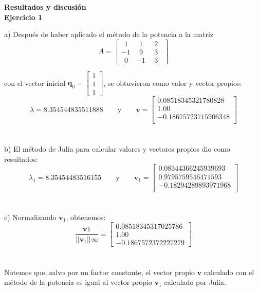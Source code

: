 \documentclass[11pt]{article}
\begin{document}
\newpage
\noindent
\textbf{\LARGE{Resultados y discusión}}
\\
\noindent
\textbf{Ejercicio 1}

a) Después de haber aplicado el método de la potencia a la matriz
$$
A =
\begin{bmatrix}
\ \ 1 & \ \ 1 & \ \ 2 \ \ \\
-1 & \ \ 9 & \ \ 3 \ \ \\
\ \ 0 & -1 & \ \ 3 \ \
\end{bmatrix}
$$

con el vector inicial $\textbf{q}_0 =
\begin{bmatrix}
1 \\
1 \\
1
\end{bmatrix}$, se obtuvieron como valor y vector propios:
 \[
 \lambda = 8.354544835511888
 \qquad\text{y}\qquad
 \textbf{v} = \begin{bmatrix}
 0.08518345321780828 \\
 1.00     \\
 -0.18675723715906348 \\
\end{bmatrix}
 \]
 \\
 \\

b) El método de Julia para calcular valores y vectores propios dio como resultados:
\[
 \lambda_1 = 8.35454483516155
 \qquad\text{y}\qquad
 \textbf{v}_1 = \begin{bmatrix}
0.08344366245939693 \\
0.9795759546471593 \\
-0.18294289893971968 \\
\end{bmatrix}
 \]
 \\
 \\

 c) Normalizando $\textbf{v}_1$, obtenemos:
 $$\frac{\textbf{v}1}{||\textbf{v}_1||\infty} =
\begin{bmatrix}
0.08518345317025786 \\
1.00 \\
-0.1867572372227279
\end{bmatrix}$$
\\
\\

Notemos que, salvo por un factor constante, el vector propio $\textbf{v}$ calculado con el método de la potencia es igual al vector propio $\textbf{v}_1$ calculado por Julia.
\\
\\
\end{document}
